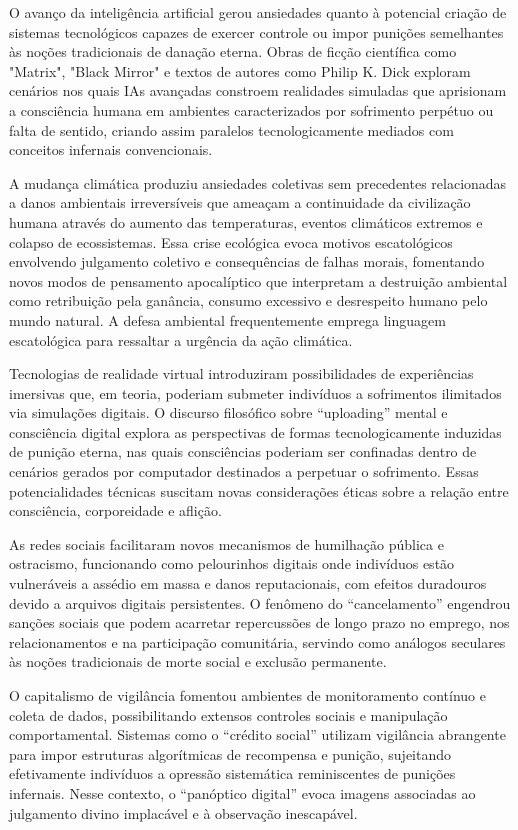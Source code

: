 O avanço da inteligência artificial gerou ansiedades quanto à potencial criação de sistemas tecnológicos capazes de exercer controle ou impor punições semelhantes às noções tradicionais de danação eterna. Obras de ficção científica como "Matrix", "Black Mirror" e textos de autores como Philip K. Dick exploram cenários nos quais IAs avançadas constroem realidades simuladas que aprisionam a consciência humana em ambientes caracterizados por sofrimento perpétuo ou falta de sentido, criando assim paralelos tecnologicamente mediados com conceitos infernais convencionais.

A mudança climática produziu ansiedades coletivas sem precedentes relacionadas a danos ambientais irreversíveis que ameaçam a continuidade da civilização humana através do aumento das temperaturas, eventos climáticos extremos e colapso de ecossistemas. Essa crise ecológica evoca motivos escatológicos envolvendo julgamento coletivo e consequências de falhas morais, fomentando novos modos de pensamento apocalíptico que interpretam a destruição ambiental como retribuição pela ganância, consumo excessivo e desrespeito humano pelo mundo natural. A defesa ambiental frequentemente emprega linguagem escatológica para ressaltar a urgência da ação climática.

Tecnologias de realidade virtual introduziram possibilidades de experiências imersivas que, em teoria, poderiam submeter indivíduos a sofrimentos ilimitados via simulações digitais. O discurso filosófico sobre “uploading” mental e consciência digital explora as perspectivas de formas tecnologicamente induzidas de punição eterna, nas quais consciências poderiam ser confinadas dentro de cenários gerados por computador destinados a perpetuar o sofrimento. Essas potencialidades técnicas suscitam novas considerações éticas sobre a relação entre consciência, corporeidade e aflição.

As redes sociais facilitaram novos mecanismos de humilhação pública e ostracismo, funcionando como pelourinhos digitais onde indivíduos estão vulneráveis a assédio em massa e danos reputacionais, com efeitos duradouros devido a arquivos digitais persistentes. O fenômeno do “cancelamento” engendrou sanções sociais que podem acarretar repercussões de longo prazo no emprego, nos relacionamentos e na participação comunitária, servindo como análogos seculares às noções tradicionais de morte social e exclusão permanente.

O capitalismo de vigilância fomentou ambientes de monitoramento contínuo e coleta de dados, possibilitando extensos controles sociais e manipulação comportamental. Sistemas como o “crédito social” utilizam vigilância abrangente para impor estruturas algorítmicas de recompensa e punição, sujeitando efetivamente indivíduos a opressão sistemática reminiscentes de punições infernais. Nesse contexto, o “panóptico digital” evoca imagens associadas ao julgamento divino implacável e à observação inescapável.

